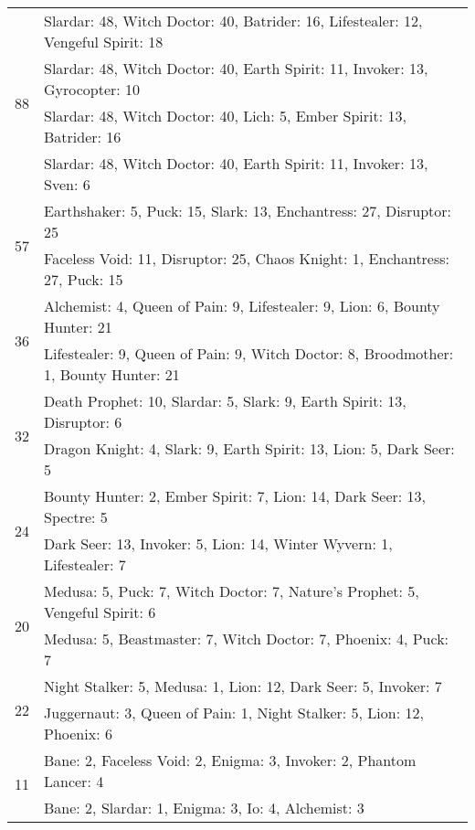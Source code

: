 \documentclass[result.tex]{subfiles}
\begin{document}
\begin{table}[H]
\begin{tabular}{ | c | p{12.5cm} | }
    \hline
    \multirow{4}{*}{88}
    & Slardar: 48, Witch Doctor: 40, Batrider: 16, Lifestealer: 12, Vengeful Spirit: 18 \\
    & Slardar: 48, Witch Doctor: 40, Earth Spirit: 11, Invoker: 13, Gyrocopter: 10 \\
    & Slardar: 48, Witch Doctor: 40, Lich: 5, Ember Spirit: 13, Batrider: 16 \\
    & Slardar: 48, Witch Doctor: 40, Earth Spirit: 11, Invoker: 13, Sven: 6 \\
    \hline
    \multirow{2}{*}{57}
    & Earthshaker: 5, Puck: 15, Slark: 13, Enchantress: 27, Disruptor: 25 \\
    & Faceless Void: 11, Disruptor: 25, Chaos Knight: 1, Enchantress: 27, Puck: 15 \\
    \hline
    \multirow{2}{*}{36}
    & Alchemist: 4, Queen of Pain: 9, Lifestealer: 9, Lion: 6, Bounty Hunter: 21 \\
    & Lifestealer: 9, Queen of Pain: 9, Witch Doctor: 8, Broodmother: 1, Bounty Hunter: 21 \\
    \hline
    \multirow{2}{*}{32}
    & Death Prophet: 10, Slardar: 5, Slark: 9, Earth Spirit: 13, Disruptor: 6 \\
    & Dragon Knight: 4, Slark: 9, Earth Spirit: 13, Lion: 5, Dark Seer: 5 \\
    \hline
    \multirow{2}{*}{24}
    & Bounty Hunter: 2, Ember Spirit: 7, Lion: 14, Dark Seer: 13, Spectre: 5 \\
    & Dark Seer: 13, Invoker: 5, Lion: 14, Winter Wyvern: 1, Lifestealer: 7 \\
    \hline
    \multirow{2}{*}{20}
    & Medusa: 5, Puck: 7, Witch Doctor: 7, Nature's Prophet: 5, Vengeful Spirit: 6 \\
    & Medusa: 5, Beastmaster: 7, Witch Doctor: 7, Phoenix: 4, Puck: 7 \\
    \hline
    \multirow{2}{*}{22}
    & Night Stalker: 5, Medusa: 1, Lion: 12, Dark Seer: 5, Invoker: 7 \\
    & Juggernaut: 3, Queen of Pain: 1, Night Stalker: 5, Lion: 12, Phoenix: 6 \\
    \hline
    \multirow{2}{*}{11}
    & Bane: 2, Faceless Void: 2, Enigma: 3, Invoker: 2, Phantom Lancer: 4 \\
    & Bane: 2, Slardar: 1, Enigma: 3, Io: 4, Alchemist: 3 \\
    \hline
  \end{tabular}
  \caption{}
  \label{}
\end{table}
\end{document}
